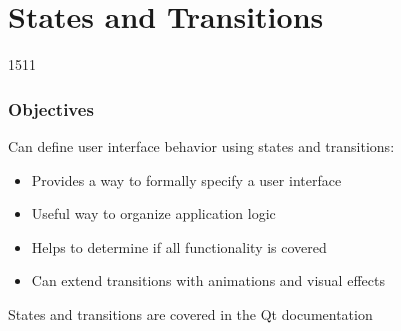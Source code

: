 %
%
%
%

\section{States and Transitions}

\begin{slide}{1511}\frametitle{Objectives}

Can define user interface behavior using states and transitions:

\begin{itemize}
\item Provides a way to formally specify a user interface
\item Useful way to organize application logic
\item Helps to determine if all functionality is covered
\item Can extend transitions with animations and visual effects
\end{itemize}

States and transitions are covered in the Qt documentation

\end{slide}




